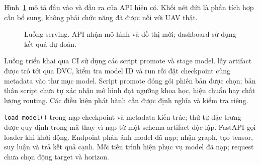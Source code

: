\documentclass[12pt,a4paper]{article}
\newcommand{\code}[1]{{\small\texttt{#1}}}
\begin{document}
Hình~\ref{fig:serving-flow} mô tả đầu vào và đầu ra của API hiện có. Khối nét đứt là phần tích hợp cần bổ sung, không phải chức năng đã được nối với UAV thật.

\begin{figure}[htbp]
  \centering
  \caption{Luồng serving. API nhận mô hình và đồ thị mới; dashboard sử dụng kết quả dự đoán.}
  \label{fig:serving-flow}
\end{figure}
\FloatBarrier

Luồng triển khai qua CI sử dụng các script promote và stage model.  lấy artifact được trỏ tới qua DVC, kiểm tra model ID và run rồi đặt checkpoint cùng metadata vào thư mục model. Script promote đóng gói phiên bản được chọn; bản thân script chưa tự xác nhận mô hình đạt ngưỡng khoa học, hiệu chuẩn hay chất lượng routing. Các điều kiện phát hành cần được định nghĩa và kiểm tra riêng.

\code{load\_model()} trong  nạp checkpoint và metadata kiến trúc; thứ tự đặc trưng được quy định trong mã thay vì nạp từ một schema artifact độc lập. FastAPI gọi loader khi khởi động. Endpoint  phản ánh model đã nạp;  nhận graph, tạo tensor, suy luận và trả kết quả cạnh. Mỗi tiến trình hiện phục vụ model đã nạp; request chưa chọn động target và horizon.
\end{document}
